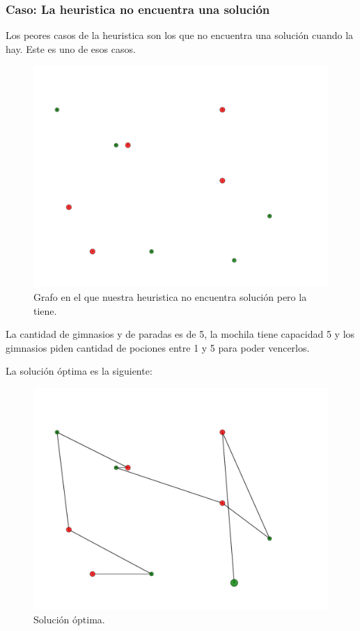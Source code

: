\subsubsection{Caso: La heuristica no encuentra una solución}

Los peores casos de la heuristica son los que no encuentra una solución cuando la hay. Este es uno de esos casos.

\begin{figure}[H]
  \begin{center}
    \includegraphics[scale=0.4]{imagenes/test5.pdf}
    \caption{Grafo en el que nuestra heuristica no encuentra solución pero la tiene.}
    \label{fig:ej2_caso4}
  \end{center}
\end{figure}

La cantidad de gimnasios y de paradas es de 5, la mochila tiene capacidad 5 y los gimnasios piden cantidad de pociones entre 1 y 5 para poder vencerlos.

La solución óptima es la siguiente:

\begin{figure}[H]
  \begin{center}
    \includegraphics[scale=0.4]{imagenes/test5-soltest5BT.pdf}
    \caption{Solución óptima.}
    \label{fig:ej2_caso4}
  \end{center}
\end{figure}



